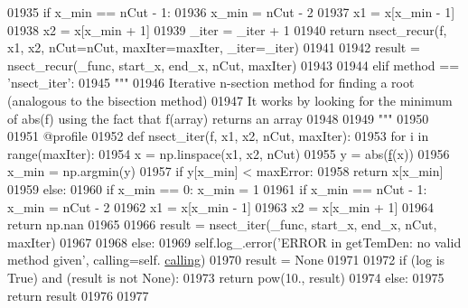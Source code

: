 \begin{DoxyCode}
01935                     \textcolor{keywordflow}{if} x\_min == nCut - 1:
01936                         x\_min = nCut - 2
01937                     x1 = x[x\_min - 1]
01938                     x2 = x[x\_min + 1]
01939                     \_iter = \_iter + 1
01940                     \textcolor{keywordflow}{return} nsect\_recur(f, x1, x2, nCut=nCut, maxIter=maxIter, \_iter=\_iter)
01941 
01942             result = nsect\_recur(\_func, start\_x, end\_x, nCut, maxIter)
01943 
01944         \textcolor{keywordflow}{elif} method == \textcolor{stringliteral}{'nsect\_iter'}:
01945             \textcolor{stringliteral}{"""}
01946 \textcolor{stringliteral}{            Iterative n-section method for finding a root (analogous to the bisection method)}
01947 \textcolor{stringliteral}{            It works by looking for the minimum of abs(f) using the fact that f(array) returns an array}
01948 \textcolor{stringliteral}{}
01949 \textcolor{stringliteral}{            """}
01950             
01951             @profile
01952             \textcolor{keyword}{def }nsect\_iter(f, x1, x2, nCut, maxIter):
01953                 \textcolor{keywordflow}{for} i \textcolor{keywordflow}{in} range(maxIter):
01954                     x = np.linspace(x1, x2, nCut)
01955                     y = abs(\hyperlink{namespacepyneb_1_1utils_1_1_fortran_format_af94352584eced016c14d524330879115}{f}(x))
01956                     x\_min = np.argmin(y)
01957                     \textcolor{keywordflow}{if} y[x\_min] < maxError:
01958                         \textcolor{keywordflow}{return} x[x\_min]
01959                     \textcolor{keywordflow}{else}:
01960                         \textcolor{keywordflow}{if} x\_min == 0: x\_min = 1
01961                         \textcolor{keywordflow}{if} x\_min == nCut - 1: x\_min = nCut - 2
01962                         x1 = x[x\_min - 1]
01963                         x2 = x[x\_min + 1]
01964                 \textcolor{keywordflow}{return} np.nan
01965 
01966             result = nsect\_iter(\_func, start\_x, end\_x, nCut, maxIter)
01967             
01968         \textcolor{keywordflow}{else}:
01969             self.log\_.error(\textcolor{stringliteral}{'ERROR in getTemDen: no valid method given'}, calling=self.
      \hyperlink{classpyneb_1_1core_1_1pynebcore_1_1_atom_a373b7735acf4f528b54bddf373ad67a1}{calling})
01970             result = \textcolor{keywordtype}{None}
01971 
01972         \textcolor{keywordflow}{if} (log \textcolor{keywordflow}{is} \textcolor{keyword}{True}) \textcolor{keywordflow}{and} (result \textcolor{keywordflow}{is} \textcolor{keywordflow}{not} \textcolor{keywordtype}{None}):
01973             \textcolor{keywordflow}{return} pow(10., result)
01974         \textcolor{keywordflow}{else}:
01975             \textcolor{keywordflow}{return} result
01976 
01977 
\end{DoxyCode}
\hypertarget{classpyneb_1_1core_1_1pynebcore_1_1_atom_a3a7c4f43d58a5988d04cbe23ed9593ba}{}
